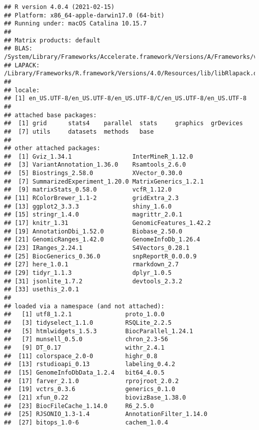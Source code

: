 \documentclass[
]{article}
\begin{document}
\begin{verbatim}
## R version 4.0.4 (2021-02-15)
## Platform: x86_64-apple-darwin17.0 (64-bit)
## Running under: macOS Catalina 10.15.7
## 
## Matrix products: default
## BLAS:   /System/Library/Frameworks/Accelerate.framework/Versions/A/Frameworks/vecLib.framework/Versions/A/libBLAS.dylib
## LAPACK: /Library/Frameworks/R.framework/Versions/4.0/Resources/lib/libRlapack.dylib
## 
## locale:
## [1] en_US.UTF-8/en_US.UTF-8/en_US.UTF-8/C/en_US.UTF-8/en_US.UTF-8
## 
## attached base packages:
##  [1] grid      stats4    parallel  stats     graphics  grDevices
##  [7] utils     datasets  methods   base     
## 
## other attached packages:
##  [1] Gviz_1.34.1                 InterMineR_1.12.0          
##  [3] VariantAnnotation_1.36.0    Rsamtools_2.6.0            
##  [5] Biostrings_2.58.0           XVector_0.30.0             
##  [7] SummarizedExperiment_1.20.0 MatrixGenerics_1.2.1       
##  [9] matrixStats_0.58.0          vcfR_1.12.0                
## [11] RColorBrewer_1.1-2          gridExtra_2.3              
## [13] ggplot2_3.3.3               shiny_1.6.0                
## [15] stringr_1.4.0               magrittr_2.0.1             
## [17] knitr_1.31                  GenomicFeatures_1.42.2     
## [19] AnnotationDbi_1.52.0        Biobase_2.50.0             
## [21] GenomicRanges_1.42.0        GenomeInfoDb_1.26.4        
## [23] IRanges_2.24.1              S4Vectors_0.28.1           
## [25] BiocGenerics_0.36.0         snpReportR_0.0.0.9         
## [27] here_1.0.1                  rmarkdown_2.7              
## [29] tidyr_1.1.3                 dplyr_1.0.5                
## [31] jsonlite_1.7.2              devtools_2.3.2             
## [33] usethis_2.0.1              
## 
## loaded via a namespace (and not attached):
##   [1] utf8_1.2.1               proto_1.0.0             
##   [3] tidyselect_1.1.0         RSQLite_2.2.5           
##   [5] htmlwidgets_1.5.3        BiocParallel_1.24.1     
##   [7] munsell_0.5.0            chron_2.3-56            
##   [9] DT_0.17                  withr_2.4.1             
##  [11] colorspace_2.0-0         highr_0.8               
##  [13] rstudioapi_0.13          labeling_0.4.2          
##  [15] GenomeInfoDbData_1.2.4   bit64_4.0.5             
##  [17] farver_2.1.0             rprojroot_2.0.2         
##  [19] vctrs_0.3.6              generics_0.1.0          
##  [21] xfun_0.22                biovizBase_1.38.0       
##  [23] BiocFileCache_1.14.0     R6_2.5.0                
##  [25] RJSONIO_1.3-1.4          AnnotationFilter_1.14.0 
##  [27] bitops_1.0-6             cachem_1.0.4            

\end{verbatim}
\end{document}
